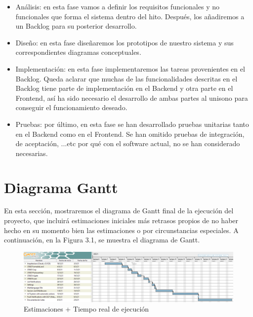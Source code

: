 \begin{itemize}
    \item Análisis: en esta fase vamos a definir los requisitos funcionales y no funcionales que forma el sistema dentro del hito. Después, los añadiremos a un Backlog para su posterior desarrollo.
    \item Diseño: en esta fase diseñaremos los prototipos de nuestro sistema y sus correspondientes diagramas conceptuales.
    \item Implementación: en esta fase implementaremos las tareas provenientes en el Backlog. Queda aclarar que muchas de las funcionalidades descritas en el Backlog tiene parte de implementación en el Backend y otra parte en el Frontend, así ha sido necesario el desarrollo de ambas partes al unisono para conseguir el funcionamiento deseado.
    \item Pruebas: por último, en esta fase se han desarrollado pruebas unitarias tanto en el Backend como en el Frontend. Se han omitido pruebas de integración, de aceptación, ...etc por qué con el software actual, no se han considerado necesarias.
\end{itemize}

\section{Diagrama Gantt}
En esta sección, mostraremos el diagrama de Gantt final de la ejecución del proyecto, que incluirá estimaciones iniciales más retrasos propios de no haber hecho en su momento bien las estimaciones o por circunstancias especiales. A continuación, en la Figura 3.1, se muestra el diagrama de Gantt.

\begin{figure}[H]
    \centering
    \includegraphics[width=1\linewidth,angle=90]{images/state-art/gantt.png}
    \caption{Estimaciones + Tiempo real de ejecución}
\end{figure}